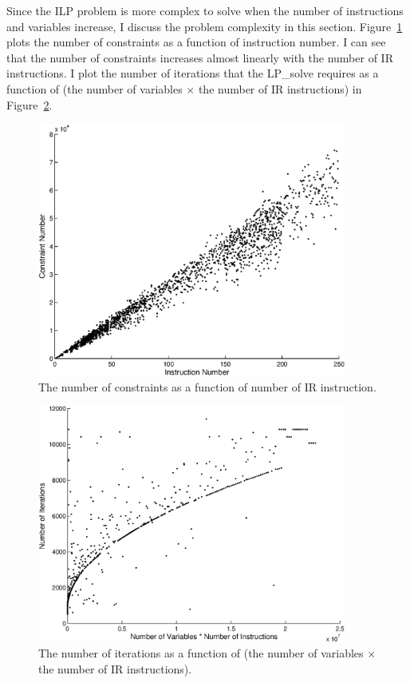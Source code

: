 Since the ILP problem is more complex to solve when the number of
instructions and variables increase, I discuss the problem complexity
in this section. Figure~\ref{fexp.inst.con} plots the number of
constraints as a function of instruction number. I can see that the
number of constraints increases almost linearly with the number of IR
instructions. I plot the number of iterations that the LP\_solve
\cite{lpsolve} requires as a function of (the number of variables
$\times$ the number of IR instructions) in Figure~\ref{fexp.iter.con}.
\begin{figure}[htbp]
\centering
\includegraphics[width=4in]{figures/inst-cons.eps}
\caption{The number of constraints as a function of number
of IR instruction.}
\label{fexp.inst.con}
\end{figure}
\begin{figure}[htbp]
\centering
\includegraphics[width=4in]{figures/iter_linear.eps}
\caption[The number of iterations as a function of.]{The number of iterations as a function of
(the number of variables $\times$ the number of IR instructions).}
\label{fexp.iter.con}
\end{figure}

